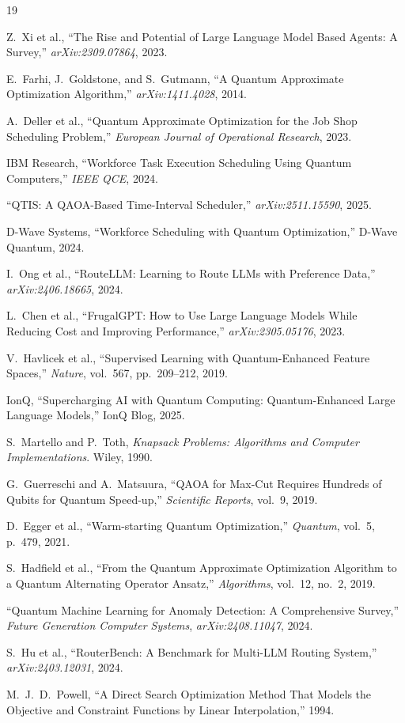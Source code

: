 \documentclass[conference]{IEEEtran}
\begin{document}
\begin{thebibliography}{19}

Z.~Xi et al., ``The Rise and Potential of Large Language Model Based Agents: A Survey,'' \emph{arXiv:2309.07864}, 2023.

E.~Farhi, J.~Goldstone, and S.~Gutmann, ``A Quantum Approximate Optimization Algorithm,'' \emph{arXiv:1411.4028}, 2014.

A.~Deller et al., ``Quantum Approximate Optimization for the Job Shop Scheduling Problem,'' \emph{European Journal of Operational Research}, 2023.

IBM Research, ``Workforce Task Execution Scheduling Using Quantum Computers,'' \emph{IEEE QCE}, 2024.

``QTIS: A QAOA-Based Time-Interval Scheduler,'' \emph{arXiv:2511.15590}, 2025.

D-Wave Systems, ``Workforce Scheduling with Quantum Optimization,'' D-Wave Quantum, 2024.

I.~Ong et al., ``RouteLLM: Learning to Route LLMs with Preference Data,'' \emph{arXiv:2406.18665}, 2024.

L.~Chen et al., ``FrugalGPT: How to Use Large Language Models While Reducing Cost and Improving Performance,'' \emph{arXiv:2305.05176}, 2023.

V.~Havlicek et al., ``Supervised Learning with Quantum-Enhanced Feature Spaces,'' \emph{Nature}, vol.~567, pp.~209--212, 2019.

IonQ, ``Supercharging AI with Quantum Computing: Quantum-Enhanced Large Language Models,'' IonQ Blog, 2025.

S.~Martello and P.~Toth, \emph{Knapsack Problems: Algorithms and Computer Implementations}. Wiley, 1990.

G.~Guerreschi and A.~Matsuura, ``QAOA for Max-Cut Requires Hundreds of Qubits for Quantum Speed-up,'' \emph{Scientific Reports}, vol.~9, 2019.

D.~Egger et al., ``Warm-starting Quantum Optimization,'' \emph{Quantum}, vol.~5, p.~479, 2021.

S.~Hadfield et al., ``From the Quantum Approximate Optimization Algorithm to a Quantum Alternating Operator Ansatz,'' \emph{Algorithms}, vol.~12, no.~2, 2019.

``Quantum Machine Learning for Anomaly Detection: A Comprehensive Survey,'' \emph{Future Generation Computer Systems}, \emph{arXiv:2408.11047}, 2024.

S.~Hu et al., ``RouterBench: A Benchmark for Multi-LLM Routing System,'' \emph{arXiv:2403.12031}, 2024.

M.~J.~D.~Powell, ``A Direct Search Optimization Method That Models the Objective and Constraint Functions by Linear Interpolation,'' 1994.

\end{thebibliography}
\end{document}
